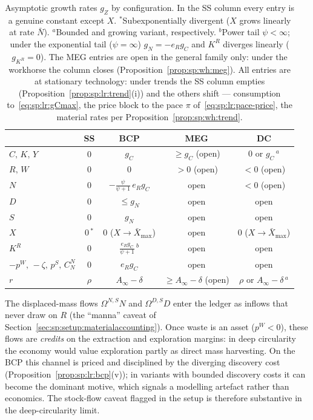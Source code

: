 \begin{table}[ht]
\centering
{\renewcommand{\arraystretch}{1.35}
\begin{tabular}{l|cccc}
 & SS & BCP & MEG & DC \\
\hline
$C,\,K,\,Y$ & $0$ & $g_C$ & $\ge g_C$ (open) & $0$ or $g_C$\,$^{a}$ \\
$R,\,W$ & $0$ & $0$ & $>0$ (open) & $<0$ (open) \\
$N$ & $0$ & $-\frac{\psi}{\psi+1}\,e_Rg_C$ & open & $<0$ (open) \\
$D$ & $0$ & $\le g_N$ & open & open \\
$S$ & $0$ & $g_N$ & open & open \\
$X$ & $0$\,$^{*}$ & $0$ ($X\to\bar X_{\max}$) & open & $0$ ($X\to\bar X_{\max}$) \\
$K^R$ & $0$ & $\frac{e_Rg_C}{\psi+1}$\,$^{b}$ & open & open \\
$-p^W,\,-\zeta,\,p^S,\,C^N_N$ & $0$ & $e_Rg_C$ & open & open \\
$r$ & $\rho$ & $A_\infty-\delta$ & $\ge A_\infty-\delta$ (open) & $\rho$ or $A_\infty-\delta$\,$^{a}$ \\
\end{tabular}}
\caption{Asymptotic growth rates $g_Z$ by configuration. In the SS column every entry is a
genuine constant except $X$. $^{*}$Subexponentially divergent ($X$ grows linearly at rate
$\bar N$). $^{a}$Bounded and growing variant, respectively. $^{b}$Power tail
$\psi<\infty$; under the exponential tail ($\psi=\infty$) $g_N=-e_Rg_C$ and $K^R$ diverges
linearly ($g_{K^R}=0$). The MEG entries are open in the general family only: under the
workhorse the column closes (Proposition~\ref{prop:sp:wh:meg}). All entries are at
stationary technology: under trends the SS column empties
(Proposition~\ref{prop:sp:lr:trend}(i)) and the others shift --- consumption
to~\eqref{eq:sp:lr:gCmax}, the price block to the pace $\pi$
of~\eqref{eq:sp:lr:pace-price}, the material rates per
Proposition~\ref{prop:sp:wh:trend}.}
\label{tab:sp:lr:rates}
\end{table}

\begin{remark}\label{rem:sp:lr:overburden}
The displaced-mass flows $\Omega^{N,S}N$ and $\Omega^{D,S}D$ enter the ledger as inflows that
never draw on $R$ (the ``manna'' caveat of Section~\ref{sec:sp:setup:materialaccounting}). Once
waste is an asset ($p^W<0$), these flows are \emph{credits} on the extraction and exploration
margins: in deep circularity the economy would value exploration partly as direct mass
harvesting. On the BCP this channel is priced and disciplined by the diverging discovery cost
(Proposition~\ref{prop:sp:lr:bcp}(v)); in variants with bounded discovery costs it can become
the dominant motive, which signals a modelling artefact rather than economics. The stock-flow
caveat flagged in the setup is therefore substantive in the deep-circularity limit.
\end{remark}


